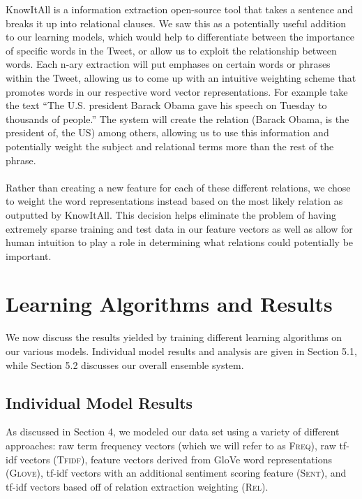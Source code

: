 \documentclass[11pt]{article}
\begin{document}
KnowItAll is a information extraction open-source tool that takes a sentence and breaks it up into relational clauses. We saw this as a potentially useful addition to our learning models, which would help to differentiate between the importance of specific words in the Tweet, or allow us to exploit the relationship between words. Each n-ary extraction will put emphases on certain words or phrases within the Tweet, allowing us to come up with an intuitive weighting scheme that promotes words in our respective word vector representations. For example take the text “The U.S. president Barack Obama gave his speech on Tuesday to thousands of people.” The system will create the relation (Barack Obama, is the president of, the US) among others, allowing us to use this information and potentially weight the subject and relational terms more than the rest of the phrase.\\ \\
Rather than creating a new feature for each of these different relations, we chose to weight the word representations instead based on the most likely relation as outputted by KnowItAll. This decision helps eliminate the problem of having extremely sparse training and test data in our feature vectors as well as allow for human intuition to play a role in determining what relations could potentially be important.

\section{Learning Algorithms and Results}

We now discuss the results yielded by training different learning algorithms on our various models. Individual model results and analysis are given in Section 5.1, while Section 5.2 discusses our overall ensemble system.

\subsection{Individual Model Results}

As discussed in Section 4, we modeled our data set using a variety of different approaches: raw term frequency vectors (which we will refer to as \textsc{Freq}), raw tf-idf vectors (\textsc{Tfidf}), feature vectors derived from GloVe word representations (\textsc{Glove}), tf-idf vectors with an additional sentiment scoring feature (\textsc{Sent}), and tf-idf vectors based off of relation extraction weighting (\textsc{Rel}).
\end{document}
